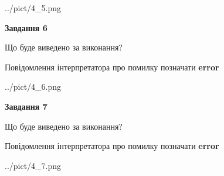 \documentclass[10pt, ukrainian]{article}
\begin{document}
{\begin {large}
\begin{center}
	{../pict/4_5.png}
\end{center}
\newpage

{\begin {center}\textbf{Завдання 6}\end {center}}\par
Що буде виведено за виконання? \par
Повідомлення інтерпретатора про помилку позначати \textbf{error}

\begin{center}
	{../pict/4_6.png}
\end{center}
\newpage

{\begin {center}\textbf{Завдання 7}\end {center}}\par
Що буде виведено за виконання? \par
Повідомлення інтерпретатора про помилку позначати \textbf{error}

\begin{center}
	{../pict/4_7.png}
\end{center}
\newpage

\end {large}}
\end{document}
